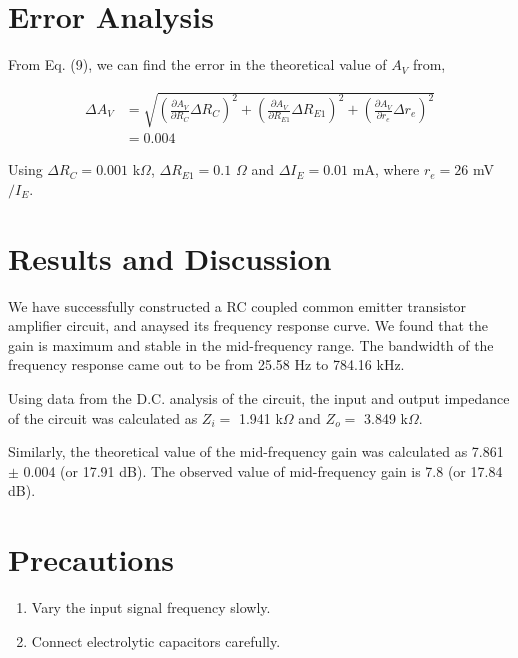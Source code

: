 \section{Error Analysis}
From Eq. (9), we can find the error in the theoretical value of $A_V$ from,

\begin{align*}
    \Delta A_V &= \sqrt{\left( \frac{\partial A_V}{\partial R_C} \Delta R_C \right)^2 + \left( \frac{\partial A_V}{\partial R_{E1}} \Delta R_{E1} \right)^2 + \left( \frac{\partial A_V}{\partial r_e} \Delta r_e \right)^2} \\ 
    & = 0.004
\end{align*}

Using $\Delta R_C = 0.001$ k$\Omega$, $\Delta R_{E1} = 0.1$ $\Omega$ and $\Delta I_E = 0.01$ mA, where $r_e=26$ mV$/I_E$.

\section{Results and Discussion}
We have successfully constructed a RC coupled common emitter transistor amplifier circuit, and anaysed its frequency response curve. We found that the gain is maximum and stable in the mid-frequency range. The bandwidth of the frequency response came out to be from 25.58 Hz to 784.16 kHz.

Using data from the D.C. analysis of the circuit, the input and output impedance of the circuit was calculated as $Z_i=$ 1.941 k$\Omega$ and $Z_o=$ 3.849 k$\Omega$.

Similarly, the theoretical value of the mid-frequency gain was calculated as 7.861 $\pm$ 0.004 (or 17.91 dB). The observed value of mid-frequency gain is 7.8 (or 17.84 dB).

\section{Precautions}
\begin{enumerate}
    \item Vary the input signal frequency slowly.
    \item Connect electrolytic capacitors carefully.
\end{enumerate}